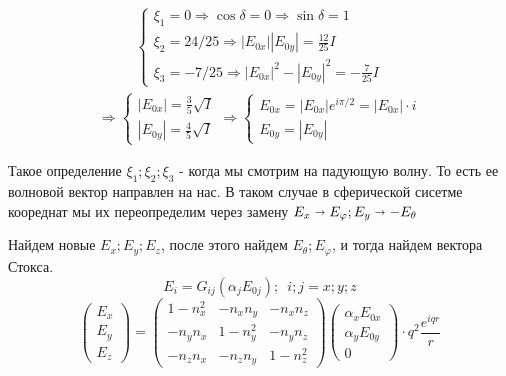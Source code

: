 \documentclass[12pt]{article}
\begin{document}
\begin{large}
\begin{eqnarray*}
    \begin{cases}
        \xi_1 = 0 \Rightarrow \cos \delta = 0  \Rightarrow \sin \delta = 1 \\
        \xi_2 = 24/25 \Rightarrow |E_{0x}||E_{0y}| = \frac{12}{25}I \\
        \xi_3 = -7/25 \Rightarrow |E_{0x}|^2 - |E_{0y}|^2 = -\frac{7}{25}I
    \end{cases}
\end{eqnarray*}
\begin{eqnarray*}
    \Rightarrow
    \begin{cases}
        |E_{0x}| = \frac{3}{5}\sqrt{I} \\
        |E_{0y}| = \frac{4}{5}\sqrt{I}
    \end{cases}
    \Rightarrow
    \begin{cases}
        E_{0x} = |E_{0x}| e^{i \pi /2} = |E_{0x}| \cdot i\\
        E_{0y} = |E_{0y}|
    \end{cases}
\end{eqnarray*}
\par Такое определение $\xi_1; \xi_2; \xi_3$ - когда мы смотрим на падующую волну. То есть ее волновой вектор направлен на нас. В таком случае в сферической сисетме коореднат мы их переопределим через замену $E_x \shortrightarrow E_\varphi ; E_y \shortrightarrow - E_\theta $
\par Найдем новые $ E_x; E_y; E_z $, после этого найдем $E_\theta ; E_\varphi$, и тогда найдем вектора Стокса.
\[
    E_i = G_{ij}\left( \alpha_j E_{0j} \right) ;  \, \, \, i; j = x; y; z
\]
\begin{equation*}
    \begin{pmatrix}
        E_x \\
        E_y \\
        E_z
    \end{pmatrix}
    =
    \begin{pmatrix}
        1 - n_x^2 & -n_x n_y &  -n_x n_z\\
        -n_y n_x & 1 - n_y^2 &  -n_y n_z\\
        -n_z n_x & -n_z n_y &  1 - n_z^2
    \end{pmatrix}
    \begin{pmatrix}
        \alpha_x E_{0x} \\
        \alpha_y E_{0y} \\
        0
    \end{pmatrix}
    \cdot q^2 \frac{e^{iqr}}{r}
\end{equation*}

\end{large}
\end{document}
